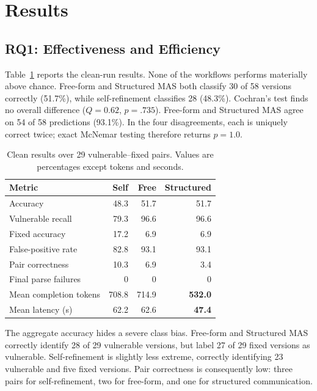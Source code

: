 \section{Results}

\subsection{RQ1: Effectiveness and Efficiency}

Table~\ref{tab:rq1} reports the clean-run results. None of the workflows performs materially above chance. Free-form and Structured MAS both classify 30 of 58 versions correctly (51.7\%), while self-refinement classifies 28 (48.3\%). Cochran's test finds no overall difference ($Q=0.62$, $p=.735$). Free-form and Structured MAS agree on 54 of 58 predictions (93.1\%). In the four disagreements, each is uniquely correct twice; exact McNemar testing therefore returns $p=1.0$.

\begin{table}[t]
\centering
\caption{Clean results over 29 vulnerable--fixed pairs. Values are percentages except tokens and seconds.}
\label{tab:rq1}
\setlength{\tabcolsep}{3.2pt}
\begin{tabular}{lrrr}
\toprule
Metric & Self & Free & Structured \\
\midrule
Accuracy & 48.3 & 51.7 & 51.7 \\
Vulnerable recall & 79.3 & 96.6 & 96.6 \\
Fixed accuracy & 17.2 & 6.9 & 6.9 \\
False-positive rate & 82.8 & 93.1 & 93.1 \\
Pair correctness & 10.3 & 6.9 & 3.4 \\
Final parse failures & 0 & 0 & 0 \\
Mean completion tokens & 708.8 & 714.9 & \textbf{532.0} \\
Mean latency (s) & 62.2 & 62.6 & \textbf{47.4} \\
\bottomrule
\end{tabular}
\end{table}

The aggregate accuracy hides a severe class bias. Free-form and Structured MAS correctly identify 28 of 29 vulnerable versions, but label 27 of 29 fixed versions as vulnerable. Self-refinement is slightly less extreme, correctly identifying 23 vulnerable and five fixed versions. Pair correctness is consequently low: three pairs for self-refinement, two for free-form, and one for structured communication.

